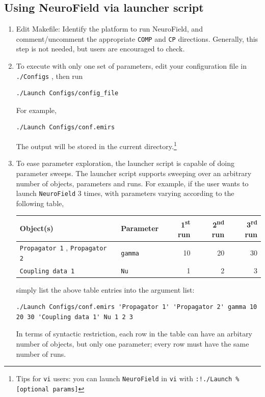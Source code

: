 \documentclass[12pt,a4paper]{article}
\newcommand{\type}[1]{ {\small\small\tt #1} }
\begin{document}
\subsection{Using NeuroField via launcher script}

\begin{enumerate}

\item Edit Makefile: Identify the platform to run NeuroField, and comment/uncomment the appropriate \type{COMP} and \type{CP} directions. Generally, this step is not needed, but users are encouraged to check.

\item To execute with only one set of parameters, edit your configuration file in \type{./Configs}, then run
\begin{lstlisting}
./Launch Configs/config_file
\end{lstlisting}
For example,
\begin{lstlisting}
./Launch Configs/conf.emirs
\end{lstlisting}
The output will be stored in the current directory.\footnote{Tips for \type{vi} users: you can launch \type{NeuroField} in \type{vi} with \type{:!./Launch \% [optional params]} }

\item To ease parameter exploration, the launcher script is capable of doing parameter sweeps. The launcher script supports sweeping over an arbitrary number of objects, parameters and runs. For example, if the user wants to launch \type{NeuroField} 3 times, with parameters varying according to the following table,

\begin{tabular}{l l r r r}
Object(s)&Parameter&1\textsuperscript{st} run&2\textsuperscript{nd} run&3\textsuperscript{rd} run\\
\hline
\type{Propagator 1}, \type{Propagator 2}&\type{gamma}&10&20&30\\
\type{Coupling data 1}&\type{Nu}&1&2&3
\end{tabular}

simply list the above table entries into the argument list:
\begin{lstlisting}
./Launch Configs/conf.emirs 'Propagator 1' 'Propagator 2' gamma 10 20 30 'Coupling data 1' Nu 1 2 3
\end{lstlisting}

In terms of syntactic restriction, each row in the table can have an arbitary number of objects, but only one parameter; every row must have the same number of runs.


\end{enumerate}
\end{document}
